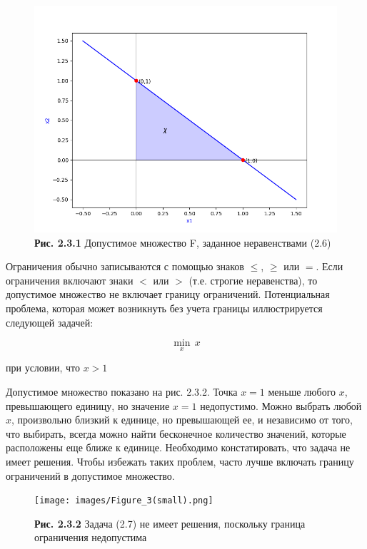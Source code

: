 \begin{figure}[ht]
 \centering
		\includegraphics[height =10 cm, keepaspectratio]{images/Figure_2.png}
		\caption{ \textbf{Рис. 2.3.1} Допустимое множество F, заданное неравенствами (2.6) }
	\end{figure}
    
Ограничения обычно записываются с помощью знаков $\leq$, $\geq$ или $=$. Если ограничения включают знаки $<$ или $>$ (т.е. строгие неравенства), то допустимое множество не включает границу ограничений. Потенциальная проблема, которая может возникнуть без учета границы иллюстрируется следующей задачей:


\begin{equation}
  \min_{x} \, x 
\end{equation}

 \begin{center}
 при условии, что $x>1$
 \end{center}

 Допустимое множество показано на рис. 2.3.2. Точка $x = 1$ меньше любого $x$, превышающего единицу, но значение $x = 1$ недопустимо. Можно выбрать любой $x$, произвольно близкий к единице, но превышающей ее, и независимо от того, что выбирать, всегда можно найти бесконечное количество значений, которые расположены еще ближе к единице. Необходимо констатировать, что задача не имеет решения. Чтобы избежать таких проблем, часто лучше включать границу ограничений в допустимое множество.


\begin{figure}[ht]
 \centering
		\texttt{[image: images/Figure\_3(small).png]}
		\caption{ \textbf{Рис. 2.3.2} Задача (2.7) не имеет решения, поскольку граница ограничения недопустима }
	\end{figure}
    
